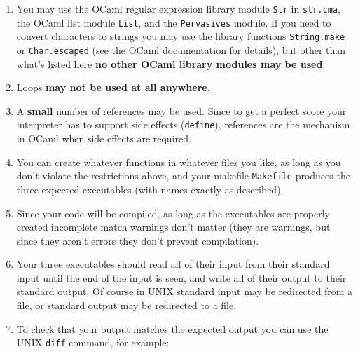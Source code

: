 \documentclass[11pt]{article}
\begin{document}
    \begin{enumerate}

      \addtolength{\itemsep}{-.5mm}

      \item You may use the OCaml regular expression library module
            \texttt{Str} in \texttt{str.cma}, the OCaml list module
            \texttt{List}, and the \texttt{Pervasives} module.  If you need
            to convert characters to strings you may use the library
            functions \texttt{String.make} or \texttt{Char.escaped} (see the
            OCaml documentation for details), but other than what's listed
            here \textbf{no other OCaml library modules may be used}.

      \item Loops \textbf{may not be used at all anywhere}.

            \enlargethispage{5mm}

      \item A \textbf{small} number of references may be used.  Since to get
            a perfect score your interpreter has to support side effects
            (\texttt{define}), references are the mechanism in OCaml when
            side effects are required.

      \item You can create whatever functions in whatever files you like, as
            long as you don't violate the restrictions above, and your
            makefile \texttt{Makefile} produces the three expected
            executables (with names exactly as described).

      \item Since your code will be compiled, as long as the executables are
            properly created incomplete match warnings don't matter (they
            are warnings, but since they aren't errors they don't prevent
            compilation).

      \item Your three executables should read all of their input from their
            standard input until the end of the input is seen, and write all
            of their output to their standard output.  Of course in UNIX
            standard input may be redirected from a file, or standard output
            may be redirected to a file.

      \item To check that your output matches the expected output you can
            use the UNIX \texttt{diff} command, for example:


\end{enumerate}
\end{document}

